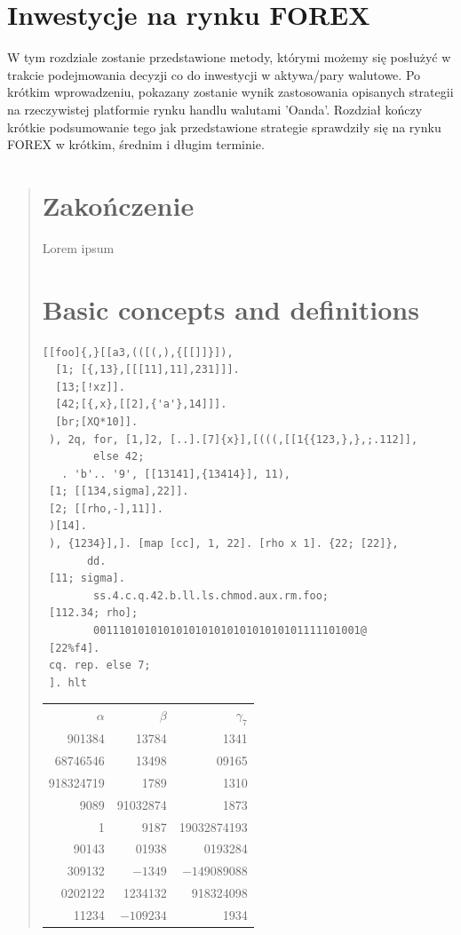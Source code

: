 \documentclass{pracamgr}
\begin{document}
\chapter{Inwestycje na rynku FOREX}
W tym rozdziale zostanie przedstawione metody, którymi możemy się posłużyć
w trakcie podejmowania decyzji co do inwestycji w aktywa/pary walutowe.
Po krótkim wprowadzeniu, pokazany zostanie wynik zastosowania opisanych 
strategii na rzeczywistej platformie rynku handlu walutami 'Oanda'.
Rozdział kończy krótkie podsumowanie tego jak przedstawione strategie 
sprawdziły się na rynku FOREX w krótkim, średnim i długim terminie. 
\begin{quote}


 \chapter*{Zakończenie}\label{r:ending}
Lorem ipsum



\appendix

\chapter{Basic concepts and definitions}

\begin{verbatim}
[[foo]{,}[[a3,(([(,),{[[]]}]),
  [1; [{,13},[[[11],11],231]]].
  [13;[!xz]].
  [42;[{,x},[[2],{'a'},14]]].
  [br;[XQ*10]].
 ), 2q, for, [1,]2, [..].[7]{x}],[(((,[[1{{123,},},;.112]],
        else 42;
   . 'b'.. '9', [[13141],{13414}], 11),
 [1; [[134,sigma],22]].
 [2; [[rho,-],11]].
 )[14].
 ), {1234}],]. [map [cc], 1, 22]. [rho x 1]. {22; [22]},
       dd.
 [11; sigma].
        ss.4.c.q.42.b.ll.ls.chmod.aux.rm.foo;
 [112.34; rho];
        001110101010101010101010101010101111101001@
 [22%f4].
 cq. rep. else 7;
 ]. hlt
\end{verbatim}
 
 


\begin{center}
  \begin{tabular}{rrr}
    $\alpha$ & $\beta$ & $\gamma_7$ \\
    901384 & 13784 & 1341\\
    68746546 & 13498& 09165\\
    918324719& 1789 & 1310 \\
    9089 & 91032874& 1873 \\
    1 & 9187 & 19032874193 \\
    90143 & 01938 & 0193284 \\
    309132 & $-1349$ & $-149089088$ \\
    0202122 & 1234132 & 918324098 \\
    11234 & $-109234$ & 1934 \\
  \end{tabular}
\end{center}


\end{quote}
\end{document}
